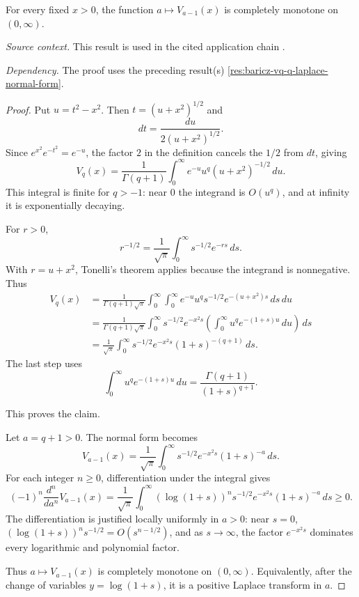 \begin{proposition}
\label{res:baricz-vq-q-complete-monotonicity}
For every fixed \(x>0\), the function \(a\mapsto V_{a-1}(x)\) is completely monotone on \((0,\infty)\).

\emph{Source context.} This result is used in the cited application chain \cite{app-app-0004-source,baricz-turan-thesis}.

\emph{Dependency.} The proof uses the preceding result(s) \ref{res:baricz-vq-q-laplace-normal-form}.
\end{proposition}
\begin{proof}
Put \(u=t^2-x^2\). Then \(t=(u+x^2)^{1/2}\) and
\[
dt=\frac{du}{2(u+x^2)^{1/2}}.
\]
Since \(e^{x^2}e^{-t^2}=e^{-u}\), the factor \(2\) in the definition cancels the \(1/2\) from \(dt\), giving
\[
V_q(x)=\frac1{\Gamma(q+1)}
\int_0^\infty e^{-u}u^q(u+x^2)^{-1/2}\,du.
\]
This integral is finite for \(q>-1\): near \(0\) the integrand is \(O(u^q)\), and at infinity it is exponentially decaying.

For \(r>0\),
\[
r^{-1/2}=\frac1{\sqrt\pi}\int_0^\infty s^{-1/2}e^{-rs}\,ds.
\]
With \(r=u+x^2\), Tonelli's theorem applies because the integrand is nonnegative. Thus
\[
\begin{aligned}
V_q(x)
&=\frac1{\Gamma(q+1)\sqrt\pi}
\int_0^\infty\int_0^\infty
e^{-u}u^q s^{-1/2}e^{-(u+x^2)s}\,ds\,du\\
&=\frac1{\Gamma(q+1)\sqrt\pi}
\int_0^\infty s^{-1/2}e^{-x^2s}
\left(\int_0^\infty u^q e^{-(1+s)u}\,du\right)\,ds\\
&=\frac1{\sqrt\pi}\int_0^\infty
s^{-1/2}e^{-x^2s}(1+s)^{-(q+1)}\,ds.
\end{aligned}
\]
The last step uses
\[
\int_0^\infty u^q e^{-(1+s)u}\,du
=\frac{\Gamma(q+1)}{(1+s)^{q+1}}.
\]

This proves the claim.

Let \(a=q+1>0\). The normal form becomes
\[
V_{a-1}(x)=\frac1{\sqrt\pi}\int_0^\infty
s^{-1/2}e^{-x^2s}(1+s)^{-a}\,ds.
\]
For each integer \(n\ge0\), differentiation under the integral gives
\[
(-1)^n\frac{d^n}{da^n}V_{a-1}(x)
=\frac1{\sqrt\pi}\int_0^\infty
(\log(1+s))^n s^{-1/2}e^{-x^2s}(1+s)^{-a}\,ds\ge0.
\]
The differentiation is justified locally uniformly in \(a>0\): near \(s=0\), \((\log(1+s))^n s^{-1/2}=O(s^{n-1/2})\), and as \(s\to\infty\), the factor \(e^{-x^2s}\) dominates every logarithmic and polynomial factor.

Thus \(a\mapsto V_{a-1}(x)\) is completely monotone on \((0,\infty)\). Equivalently, after the change of variables \(y=\log(1+s)\), it is a positive Laplace transform in \(a\).


\end{proof}
